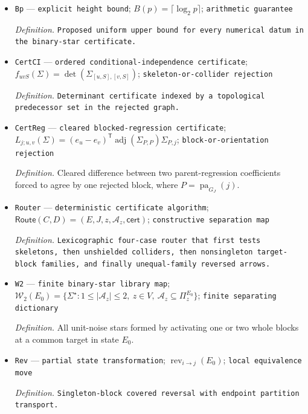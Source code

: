 \documentclass{article}
\begin{document}
\begin{itemize}
  \item \texttt{Bp} --- \texttt{explicit height bound}; \(B(p)=\lceil\log_2 p\rceil\); \texttt{arithmetic guarantee}
  \par\smallskip\noindent\emph{Definition.} \texttt{Proposed uniform upper bound for every numerical datum in the binary-\allowbreak{}star certificate.}
  \item \texttt{CertCI} --- \texttt{ordered conditional-\allowbreak{}independence certificate}; \(f_{uvS}(\Sigma)=\det(\Sigma_{[u,S],[v,S]})\); \texttt{skeleton-\allowbreak{}or-\allowbreak{}collider rejection}
  \par\smallskip\noindent\emph{Definition.} \texttt{Determinant certificate indexed by a topological predecessor set in the rejected graph.}
  \item \texttt{CertReg} --- \texttt{cleared blocked-\allowbreak{}regression certificate}; \(L_{j;u,v}(\Sigma)=(e_u-e_v)^{\mathsf T}\operatorname{adj}(\Sigma_{P,P})\Sigma_{P,j}\); \texttt{block-\allowbreak{}or-\allowbreak{}orientation rejection}
  \par\smallskip\noindent\emph{Definition.} Cleared difference between two parent-regression coefficients forced to agree by one rejected block, where \(P=\operatorname{pa}_{G_J}(j)\).
  \item \texttt{Router} --- \texttt{deterministic certificate algorithm}; \(\mathsf{Route}(C,D)=(E,J,z,\mathcal A_z,\mathsf{cert})\); \texttt{constructive separation map}
  \par\smallskip\noindent\emph{Definition.} \texttt{Lexicographic four-\allowbreak{}case router that first tests skeletons,\allowbreak{} then unshielded colliders,\allowbreak{} then nonsingleton target-\allowbreak{}block families,\allowbreak{} and finally unequal-\allowbreak{}family reversed arrows.}
  \item \texttt{W2} --- \texttt{finite binary-\allowbreak{}star library map}; \(\mathcal W_2(E_0)=\{\Sigma^{\star}:1\leq|\mathcal A_z|\leq2,\ z\in V,\ \mathcal A_z\subseteq\Pi^{E_0}_z\}\); \texttt{finite separating dictionary}
  \par\smallskip\noindent\emph{Definition.} All unit-noise stars formed by activating one or two whole blocks at a common target in state \(E_0\).
  \item \texttt{Rev} --- \texttt{partial state transformation}; \(\operatorname{rev}_{i\to j}(E_0)\); \texttt{local equivalence move}
  \par\smallskip\noindent\emph{Definition.} \texttt{Singleton-\allowbreak{}block covered reversal with endpoint partition transport.}

\end{itemize}
\end{document}
